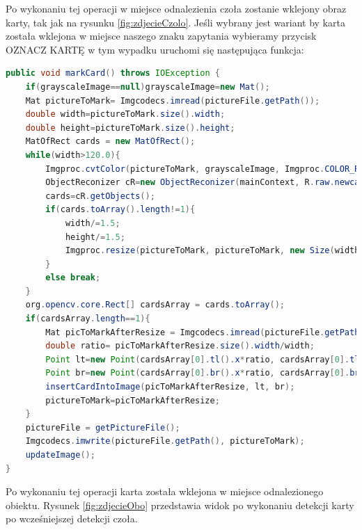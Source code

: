 Po wykonaniu tej operacji w miejsce odnalezienia czoła zostanie wklejony obraz karty, tak jak na rysunku \ref{fig:zdjecieCzolo}. 
Jeśli wybrany jest wariant by karta została wklejona w miejsce naszego znaku zapytania wybieramy przycisk OZNACZ KARTĘ w tym wypadku uruchomi się następująca funkcja:

\begin{lstlisting}[language=Java]
public void markCard() throws IOException {
    if(grayscaleImage==null)grayscaleImage=new Mat();
    Mat pictureToMark= Imgcodecs.imread(pictureFile.getPath());
    double width=pictureToMark.size().width;
    double height=pictureToMark.size().height;
    MatOfRect cards = new MatOfRect();
    while(width>120.0){
        Imgproc.cvtColor(pictureToMark, grayscaleImage, Imgproc.COLOR_RGBA2RGB);
        ObjectReconizer cR=new ObjectReconizer(mainContext, R.raw.newcard, "newcard.xml", grayscaleImage, 1.4, 25);
        cards=cR.getObjects();
        if(cards.toArray().length!=1){
            width/=1.5;
            height/=1.5;
            Imgproc.resize(pictureToMark, pictureToMark, new Size(width,height ));
        }
        else break;
    }
    org.opencv.core.Rect[] cardsArray = cards.toArray();
    if(cardsArray.length==1){
        Mat picToMarkAfterResize = Imgcodecs.imread(pictureFile.getPath());
        double ratio= picToMarkAfterResize.size().width/width;
        Point lt=new Point(cardsArray[0].tl().x*ratio, cardsArray[0].tl().y*ratio);
        Point br=new Point(cardsArray[0].br().x*ratio, cardsArray[0].br().y*ratio);
        insertCardIntoImage(picToMarkAfterResize, lt, br);
        pictureToMark=picToMarkAfterResize;
    }
    pictureFile = getPictureFile();
    Imgcodecs.imwrite(pictureFile.getPath(), pictureToMark);
    updateImage();
}
\end{lstlisting}

Po wykonaniu tej operacji karta została wklejona w miejsce odnalezionego obiektu. Rysunek \ref{fig:zdjecieObo} przedstawia widok po wykonaniu detekcji karty po wcześniejszej detekcji czoła.
